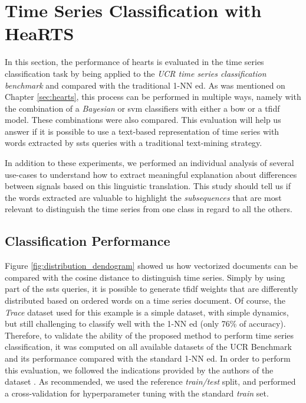 \section{Time Series Classification with HeaRTS}

In this section, the performance of \gls{hearts} is evaluated in the time series classification task by being applied to the \textit{UCR time series classification benchmark} and compared with the traditional 1-NN \gls{ed}. As was mentioned on Chapter \ref{sec:hearts}, this process can be performed in multiple ways, namely with the combination of a \textit{Bayesian} or \gls{svm} classifiers with either a \gls{bow} or a \gls{tfidf} model. These combinations were also compared. This evaluation will help us answer if it is possible to use a text-based representation of time series with words extracted by \gls{ssts} queries with a traditional text-mining strategy.

In addition to these experiments, we performed an individual analysis of several use-cases to understand how to extract meaningful explanation about differences between signals based on this linguistic translation. This study should tell us if the words extracted are valuable to highlight the \textit{subsequences} that are most relevant to distinguish the time series from one class in regard to all the others. 

\subsection{Classification Performance}

Figure \ref{fig:distribution_dendogram} showed us how vectorized documents can be compared with the cosine distance to distinguish time series. Simply by using part of the \gls{ssts} queries, it is possible to generate \gls{tfidf} weights that are differently distributed based on ordered words on a time series document. Of course, the \textit{Trace} dataset used for this example is a simple dataset, with simple dynamics, but still challenging to classify well with the 1-NN \gls{ed} (only 76\% of accuracy). Therefore, to validate the ability of the proposed method to perform time series classification, it was computed on all available datasets of the UCR Benchmark and its performance compared with the standard 1-NN \gls{ed}. In order to perform this evaluation, we followed the indications provided by the authors of the dataset \cite{ucr}. As recommended, we used the reference \textit{train/test} split, and performed a cross-validation for hyperparameter tuning with the standard \textit{train} set.

